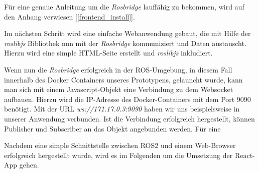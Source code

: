 \begin{flushleft}
Für eine genaue Anleitung um die \textit{Rosbridge} lauffähig zu bekommen, wird auf den Anhang verwiesen [\ref{frontend_install}].

Im nächsten Schritt wird eine einfache Webanwendung gebaut, die mit Hilfe der \textit{roslibjs} Bibliothek nun mit der \textit{Rosbridge} kommuniziert und Daten austauscht. 
Hierzu wird eine simple HTML-Seite erstellt und \textit{roslibjs} inkludiert. 




Wenn nun die \textit{Rosbridge} erfolgreich in der ROS-Umgebung, in diesem Fall innerhalb des Docker Containers unseres Prototypens, gelauncht wurde, kann man sich mit einem Javascript-Objekt eine Verbindung zu dem Websocket aufbauen.
Hierzu wird die IP-Adresse des Docker-Containers mit dem Port 9090 benötigt.
Mit der URL \textit{ws://171.17.0.3:9090} haben wir uns beispielsweise in unserer Anwendung verbunden.
Ist die Verbindung erfolgreich hergestellt, können Publisher und Subscriber an das Objekt angebunden werden.
Für eine 

Nachdem eine simple Schnittstelle zwischen ROS2 und einem Web-Browser erfolgreich hergestellt wurde, wird es im Folgenden um die Umsetzung der React-App gehen. 




\end{flushleft}